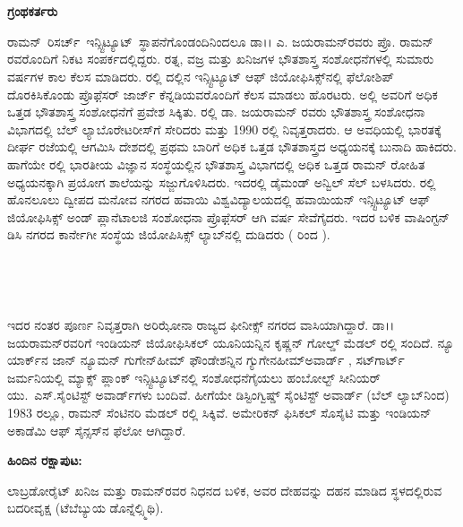 
\newpage
~ 

\thispagestyle{empty}

~\phantom{a}



\noindent
\begin{minipage}[c]{6cm}
\textbf{\large{ಗ್ರಂಥಕರ್ತರು}}

\medskip
\medskip

{\parfillskip=0pt
ರಾಮನ್~ರಿಸರ್ಚ್~ಇನ್ಸ್ಟಿಟ್ಯೂಟ್~ಸ್ಥಾಪನೆಗೊಂಡಂದಿ\enginline{-}\break ನಿಂದಲೂ ಡಾ।। ಎ. ಜಯರಾಮನ್‍‌ರವರು ಪ್ರೊ. ರಾಮನ್ ರವರೊಂದಿಗೆ ನಿಕಟ ಸಂಪರ್ಕದಲ್ಲಿದ್ದರು. ರತ್ನ, ವಜ್ರ ಮತ್ತು ಖನಿಜಗಳ ಭೌತಶಾಸ್ತ್ರ ಸಂಶೋಧನೆಗಳಲ್ಲಿ ಸುಮಾರು  ವರ್ಷಗಳ ಕಾಲ ಕೆಲಸ ಮಾಡಿದರು.  ರಲ್ಲಿ  ದಲ್ಲಿನ ಇನ್ಸ್ಟಿಟ್ಯೂಟ್ ಆಫ್ ಜಿಯೋಫಿಸಿಕ್ಸ್‌ನಲ್ಲಿ ಫೆಲೋಶಿಪ್ ‍ದೊರಕಿಸಿಕೊಂಡು ಪ್ರೊಫೆ಼ಸರ್ ಜಾರ್ಜ್ ಕೆನ್ನಡಿಯವರೊಂದಿಗೆ ಕೆಲಸ ಮಾಡಲು ಹೊರಟರು. ಅಲ್ಲಿ ಅವರಿಗೆ ಅಧಿಕ ಒತ್ತಡ ಭೌತಶಾಸ್ತ್ರ ಸಂಶೋಧನೆಗೆ ಪ್ರವೇಶ ಸಿಕ್ಕಿತು.  ರಲ್ಲಿ ಡಾ. ಜಯರಾಮನ್ ರವರು ಭೌತಶಾಸ್ತ್ರ ಸಂಶೋಧನಾ ವಿಭಾಗದಲ್ಲಿ ಬೆಲ್ ಲ್ಯಾಬೊರೇಟರೀಸ್‌ಗೆ ಸೇರಿದರು ಮತ್ತು 1990 ರಲ್ಲಿ ನಿವೃತ್ತರಾದರು. ಆ ಅವಧಿಯಲ್ಲಿ  ಭಾರತಕ್ಕೆ ದೀರ್ಘ ರಜೆಯಲ್ಲಿ ಆಗಮಿಸಿ ದೇಶದಲ್ಲಿ ಪ್ರಥಮ ಬಾರಿಗೆ ಅಧಿಕ ಒತ್ತಡ ಭೌತಶಾಸ್ತ್ರದ ಅಧ್ಯಯನಕ್ಕೆ ಬುನಾದಿ ಹಾಕಿದರು. ಹಾಗೆಯೇ  ರಲ್ಲಿ ಭಾರತೀಯ ವಿಜ್ಞಾನ ಸಂಸ್ಥೆಯಲ್ಲಿನ ಭೌತಶಾಸ್ತ್ರ ವಿಭಾಗದಲ್ಲಿ ಅಧಿಕ ಒತ್ತಡ ರಾಮನ್ ರೋಹಿತ ಅಧ‍್ಯಯನಕ್ಕಾಗಿ ಪ್ರಯೋಗ ಶಾಲೆಯನ್ನು ಸಜ್ಜುಗೊಳಿಸಿದರು. ಇದರಲ್ಲಿ ಡೈಮಂಡ್ ಅನ್ವಿಲ್ ಸೆಲ್ ಬಳಸಿದರು.  ರಲ್ಲಿ ಹೊನಲೂಲು ದ್ವೀಪದ ಮನೋವ ನಗರದ ಹವಾಯಿ ವಿಶ್ವವಿದ್ಯಾಲಯದಲ್ಲಿ ಹವಾಯಿಯನ್ ಇನ್ಸ್ಟಿಟ್ಯೂಟ್ ಆಫ್ ಜಿಯೋಫಿಸಿಕ್ಸ್ ಅಂಡ್ ಪ್ಲಾನೆಟಾಲಜಿ ಸಂಶೋಧನಾ ಪ್ರೊಫೆ಼ಸರ್ ಆಗಿ  ವರ್ಷ ಸೇವೆಗೈದರು. ಇದರ ಬಳಿಕ ವಾಷಿಂಗ್ಟನ್ ಡಿಸಿ ನಗರದ ಕಾರ್ನೇಗೀ ಸಂಸ್ಥೆಯ ಜಿಯೋಪಿಸಿಕ್ಸ್ ಲ್ಯಾಬ್‍ನಲ್ಲಿ ದುಡಿದರು ( ರಿಂದ ).\par} 
\end{minipage}

\newpage
~ 

\thispagestyle{empty}

~\phantom{a}



\noindent
\begin{minipage}[c]{6cm}
ಇದರ ನಂತರ ಪೂರ್ಣ ನಿವೃತ್ತರಾಗಿ ಅರಿಝೋನಾ ರಾಜ್ಯದ ಫೀನೀಕ್ಸ್ ನಗರದ ವಾಸಿಯಾಗಿದ್ದಾರೆ.  ಡಾ।। ಜಯರಾಮನ್‌ರವರಿಗೆ ಇಂಡಿಯನ್ ಜಿಯೋಫಿಸಿಕಲ್ ಯೂನಿಯನ್ನಿನ ಕೃಷ್ಣನ್ ಗೋಲ್ಡ್ ಮೆಡಲ್  ರಲ್ಲಿ ಸಂದಿದೆ. ನ್ಯೂ ಯಾರ್ಕ್‌ನ  ಜಾನ್ ನ್ಯೂಮನ್ ಗುಗೇನ್‌ಹೀಮ್ ಫೌಂಡೇಶನ್ನಿನ ಗ್ಯುಗೇನ‌ಹೀಮ್\break ಅವಾರ್ಡ್ , ಸಟ್‍ಗಾರ್ಟ್  ಜರ್ಮನಿಯಲ್ಲಿ ಮ್ಯಾಕ್ಸ್ ಪ್ಲಾಂಕ್ ಇನ್ಸ್ಟಿಟ್ಯೂಟ್‌ನಲ್ಲಿ ಸಂಶೋಧನೆ\break ಗೈಯಲು ಹಂಬೋಲ್ಟ್ ಸೀನಿಯರ್ ಯು.~ಎಸ್.\break ಸೈಂಟಿಸ್ಟ್ ಅವಾರ್ಡ್‌ಗಳು ಬಂದಿವೆ. ಹೀಗೆಯೇ ಡಿಸ್ಟಿಂಗ್ವಿಷ್ಡ್ ಸೈಂಟಿಸ್ಟ್ ಅವಾರ್ಡ್ (ಬೆಲ್ ಲ್ಯಾಬ್‍‌\break ನಿಂದ) 1983 ರಲ್ಲೂ, ರಾಮನ್ ಸೆಂಟಿನರಿ ಮೆಡಲ್\break {} ರಲ್ಲಿ ಸಿಕ್ಕಿವೆ. ಅಮೇರಿಕನ್ ಫಿಸಿಕಲ್ ಸೊಸೈಟಿ ಮತ್ತು ಇಂಡಿಯನ್ ಅಕಾಡೆಮಿ ಆಫ್ ಸೈನ್ಸಸ್‌ನ ಫೆಲೋ ಆಗಿದ್ದಾರೆ. 

\medskip
\medskip

\noindent
\textbf{ಹಿಂದಿನ ರಕ್ಷಾಪುಟ: }

\medskip

\noindent
ಲಾಬ್ರಡೋರೈಟ್ ಖನಿಜ ಮತ್ತು ರಾಮನ್‌ರವರ ನಿಧನದ  ಬಳಿಕ, ಅವರ ದೇಹವನ್ನು ದಹನ ಮಾಡಿದ ಸ್ಥಳದಲ್ಲಿರುವ ಬದರೀವೃಕ್ಷ (ಟೆಬೆಬ್ಯುಯ ಡೊನ್ನೆಲ್\enginline{--}ಸ್ಮಿಥಿ).  
\end{minipage}

